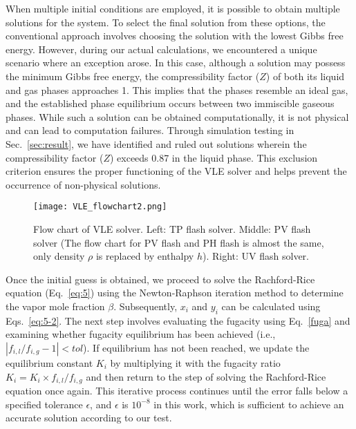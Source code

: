 {When multiple initial conditions are employed, it is possible to obtain multiple solutions for the system. To select the final solution from these options, the conventional approach involves choosing the solution with the lowest Gibbs free energy. However, during our actual calculations, we encountered a unique scenario where an exception arose. In this case, although a solution may possess the minimum Gibbs free energy, the compressibility factor ($Z$) of both its liquid and gas phases approaches 1. This implies that the phases resemble an ideal gas, and the established phase equilibrium occurs between two immiscible gaseous phases. While such a solution can be obtained computationally, it is not physical and can lead to computation failures. Through simulation testing in Sec.~\ref{sec:result}, we have identified and ruled out solutions wherein the compressibility factor ($Z$) exceeds 0.87 in the liquid phase. This exclusion criterion ensures the proper functioning of the VLE solver and helps prevent the occurrence of non-physical solutions. }

\begin{figure}[htbp]
	\centering
	\texttt{[image: VLE\_flowchart2.png]}
	\caption{Flow chart of VLE solver. Left: TP flash solver. Middle: PV flash solver (The flow chart for PV flash and PH flash is almost the same, only density $\rho$ is replaced by enthalpy $h$). Right: UV flash solver.}
	\label{FC}
\end{figure}

Once the initial guess is obtained, we proceed to solve the Rachford-Rice equation (Eq.~\ref{eq:5}) using the Newton-Raphson iteration method to determine the vapor mole fraction $\beta$. Subsequently, $x_i$ and $y_i$ can be calculated using Eqs.~\ref{eq:5-2}. The next step involves evaluating the fugacity using Eq.~\ref{fuga} and examining whether fugacity equilibrium has been achieved (i.e., $\left|f_{i,l}/f_{i,g}-1\right| < tol $). If equilibrium has not been reached, we update the equilibrium constant $K_i$ by multiplying it with the fugacity ratio $K_i=K_i \times f_{i,l}/f_{i,g}$ and then return to the step of solving the Rachford-Rice equation once again. This iterative process continues until the error falls below a specified tolerance $\epsilon$, and $\epsilon$ is $10^{-8}$ in this work, which is sufficient to achieve an accurate solution according to our test.


